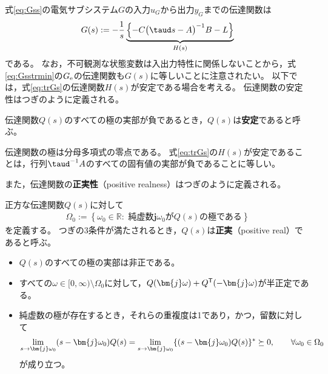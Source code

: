 \documentclass[tombow,dvipdfmx]{corona-a5-1.1}
\begin{document}
式\ref{eq:Gss}の電気サブシステム$G$の入力$u_G$から出力$y_G$までの伝達関数は
\begin{align}\label{eq:trGs}
G(s) :=  - \frac{1}{s} 
\underbrace{
\left\{ -C \bigl( \taud s -A \bigr)^{-1} B - L \right\}
}_{H(s)}
\end{align}
である。
なお，不可観測な状態変数は入出力特性に関係しないことから，式\ref{eq:Gsstrmin}の$G_{\rm e}$の伝達関数も$G(s)$に等しいことに注意されたい。
以下では，式\ref{eq:trGs}の伝達関数$H(s)$が安定である場合を考える。
伝達関数の安定性はつぎのように定義される。

\begin{定義}[伝達関数の安定性]\label{def:trsta}
伝達関数$Q(s)$のすべての極の実部が負であるとき，$Q(s)$は\textbf{安定}であると呼ぶ。
\end{定義}

伝達関数の極は分母多項式の零点である。
式\ref{eq:trGs}の$H(s)$が安定であることは，行列$\taud^{-1}A$のすべての固有値の実部が負であることに等しい。

また，伝達関数の\textbf{正実性}（positive realness）はつぎのように定義される。

\begin{定義}[伝達関数の正実性]\label{def:trpf}
正方な伝達関数$Q(s)$に対して
\begin{align}\label{eq:defOm0}
\Omega_0 := \left\{
\omega_0 \in \mathbb{R}: 
\mbox{ 純虚数$\bm{j} \omega_0$が$Q(s)$の極である}
\right\}
\end{align}
を定義する。
つぎの3条件が満たされるとき，$Q(s)$は\textbf{正実}（positive real）であると呼ぶ。
\begin{itemize}
\item $Q(s)$のすべての極の実部は非正である。
\item すべての$\omega \in [0,\infty)\setminus \Omega_0$に対して，$Q(\bm{j} \omega) + Q^{\sf T}(-\bm{j} \omega)$が半正定である。
\item 純虚数の極が存在するとき，それらの重複度は1であり，かつ，留数に対して
\begin{align*}
\lim_{s \rightarrow \bm{j} \omega_0} (s-\bm{j} \omega_0) Q(s) = \lim_{s\rightarrow \bm{j} \omega_0} \{ (s-\bm{j} \omega_0) Q(s)\}^{\sf *}\succeq 0
,\qquad
\forall \omega_0 \in \Omega_0
\end{align*}
が成り立つ。
\end{itemize}
\end{定義}
\end{document}
